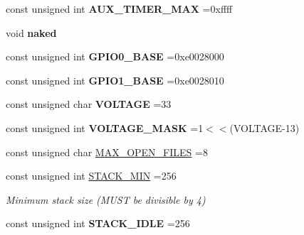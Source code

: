 \begin{DoxyCompactItemize}
\item 
\hypertarget{group___settings_ga7dd71afdc06b796d60710073f8a2a962}{const unsigned int {\bfseries A\-U\-X\-\_\-\-T\-I\-M\-E\-R\-\_\-\-M\-A\-X} =0xffff}\label{group___settings_ga7dd71afdc06b796d60710073f8a2a962}

\item 
\hypertarget{namespacemiosix_a39a7d64266e8c49b201c82b63b9d51cd}{void {\bfseries naked}}\label{namespacemiosix_a39a7d64266e8c49b201c82b63b9d51cd}

\item 
\hypertarget{namespacemiosix_a8049ecd0146905d143611b5cd866c728}{const unsigned int {\bfseries G\-P\-I\-O0\-\_\-\-B\-A\-S\-E} =0xe0028000}\label{namespacemiosix_a8049ecd0146905d143611b5cd866c728}

\item 
\hypertarget{namespacemiosix_a49ffa913fdac5fe141fe614a1855d3a7}{const unsigned int {\bfseries G\-P\-I\-O1\-\_\-\-B\-A\-S\-E} =0xe0028010}\label{namespacemiosix_a49ffa913fdac5fe141fe614a1855d3a7}

\item 
\hypertarget{namespacemiosix_a72b8d253273983dd634b48ab60c14b3e}{const unsigned char {\bfseries V\-O\-L\-T\-A\-G\-E} =33}\label{namespacemiosix_a72b8d253273983dd634b48ab60c14b3e}

\item 
\hypertarget{namespacemiosix_a4ca20e22531d07dbecf112ae77ce5ba5}{const unsigned int {\bfseries V\-O\-L\-T\-A\-G\-E\-\_\-\-M\-A\-S\-K} =1$<$$<$(V\-O\-L\-T\-A\-G\-E-\/13)}\label{namespacemiosix_a4ca20e22531d07dbecf112ae77ce5ba5}

\item 
const unsigned char \hyperlink{group___settings_ga0ec1a8ab604e6a08eec2994d436346f7}{M\-A\-X\-\_\-\-O\-P\-E\-N\-\_\-\-F\-I\-L\-E\-S} =8
\item 
\hypertarget{group___settings_ga26c88a1771bb21a80aa22789d16291d1}{const unsigned int \hyperlink{group___settings_ga26c88a1771bb21a80aa22789d16291d1}{S\-T\-A\-C\-K\-\_\-\-M\-I\-N} =256}\label{group___settings_ga26c88a1771bb21a80aa22789d16291d1}

\begin{DoxyCompactList}\small\item\em Minimum stack size (M\-U\-S\-T be divisible by 4) \end{DoxyCompactList}\item 
\hypertarget{group___settings_gaafda5e97a80f6b13837817f32eb9c83f}{const unsigned int {\bfseries S\-T\-A\-C\-K\-\_\-\-I\-D\-L\-E} =256}\label{group___settings_gaafda5e97a80f6b13837817f32eb9c83f}


\end{DoxyCompactItemize}
